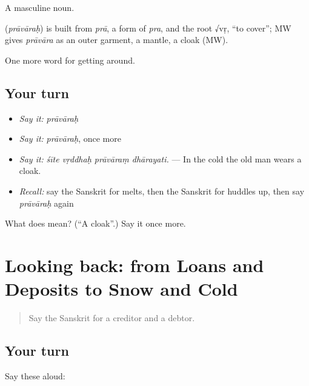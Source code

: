 A masculine noun.

\begin{cousinweb}
\textbf{} (\emph{prāvāraḥ}) is built from \emph{prā}, a form of \emph{pra}, and the root √vṛ, \textquotedblleft{}to cover\textquotedblright{}; MW gives \emph{prāvāra} as an outer garment, a mantle, a cloak (MW).
\end{cousinweb}

\begin{grammarlens}[title={What you've built}]
One more word for getting around.
\end{grammarlens}

\subsection*{Your turn}
\begin{itemize}
\raggedright
  \item \emph{Say it:} \emph{prāvāraḥ}
  \item \emph{Say it:} \emph{prāvāraḥ}, once more
  \item \emph{Say it:} \emph{śīte vṛddhaḥ prāvāraṃ dhārayati.} — In the cold the old man wears a cloak.
  \item \emph{Recall:} say the Sanskrit for melts, then the Sanskrit for huddles up, then say \emph{prāvāraḥ} again
\end{itemize}

\begin{tcolorbox}[breakable,colback=teal!4,colframe=teal!35!black,title={Before you move on}]
What does  mean? (\textquotedblleft{}A cloak\textquotedblright{}.) Say it once more.
\end{tcolorbox}
\section[(dialogue)]{Looking back: from Loans and Deposits to Snow and Cold}

\label{lesson:SA-R440-review-434-440}



\begin{quote}
Say the Sanskrit for a creditor and a debtor.
\end{quote}

\subsection*{Your turn}
Say these aloud:

